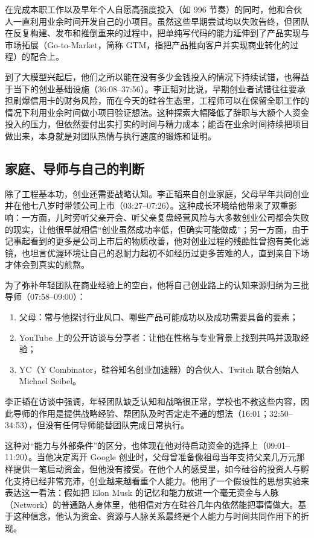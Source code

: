 \documentclass[UTF8,a4paper,11pt,fontset=fandol]{ctexart}
\begin{document}
在完成本职工作以及早年个人自愿高强度投入（如 996 节奏）的同时，他和合伙人一直利用业余时间开发自己的小项目。虽然这些早期尝试均以失败告终，但团队在反复构建、发布和推倒重来的过程中，把单纯写代码的能力延伸到了产品实现与市场拓展（Go-to-Market，简称 GTM，指把产品推向客户并实现商业转化的过程）的配合上。

到了大模型兴起后，他们之所以能在没有多少金钱投入的情况下持续试错，也得益于当下的创业基础设施（36:08–37:56）。李正韬对比说，早期创业者试错往往要承担刷爆信用卡的财务风险，而在今天的硅谷生态里，工程师可以在保留全职工作的情况下利用业余时间做小项目验证想法。这种探索大幅降低了辞职与大额个人资金投入的压力，但依然要付出实打实的时间与精力成本；能否在业余时间持续把项目做出来，本身就是对团队热情与执行速度的锻炼和证明。

\subsection{家庭、导师与自己的判断}
除了工程基本功，创业还需要战略认知。李正韬来自创业家庭，父母早年共同创业并在他七八岁时带领公司上市（03:27–07:26）。这种成长环境给他带来了双重影响：一方面，儿时旁听父亲开会、听父亲复盘经营风险与大多数创业公司都会失败的现实，让他很早就相信“创业虽然成功率低，但确实可能做成”；另一方面，由于记事起看到的更多是公司上市后的物质改善，他对创业过程的残酷性曾抱有美化滤镜，也坦言优渥环境让自己的忍耐力起初不如经历过更多苦难的人，直到亲自下场才体会到真实的煎熬。

为了弥补年轻团队在商业经验上的空白，他将自己创业路上的认知来源归纳为三批导师（07:58–09:00）：
\begin{enumerate}
\item 父母：常与他探讨行业风口、哪些产品可能成功以及成功需要具备的要素；
\item YouTube 上的公开访谈与分享者：让他在性格与专业背景上找到共鸣并汲取经验；
\item YC（Y Combinator，硅谷知名创业加速器）的合伙人、Twitch 联合创始人 Michael Seibel。

\end{enumerate}
李正韬在访谈中强调，年轻团队缺乏认知和战略很正常，学校也不教这些内容，因此导师的作用是提供战略经验、帮团队及时否定走不通的想法（16:01；32:50–34:53），但没有任何导师能替团队完成日常执行。

这种对“能力与外部条件”的区分，也体现在他对待启动资金的选择上（09:01–11:20）。当他决定离开 Google 创业时，父母曾准备像祖母当年支持父亲几万元那样提供一笔启动资金，但他没有接受。在他个人的感受里，如今硅谷的投资人与孵化支持已经非常充沛，创业越来越看重个人能力。他用了一个假设性的思想实验来表达这一看法：假如把 Elon Musk 的记忆和能力放进一个毫无资金与人脉（Network）的普通路人身体里，他相信对方在硅谷几年内依然能把事情做大。基于这种信念，他认为资金、资源与人脉关系最终是个人能力与时间共同作用下的折现。
\end{document}
